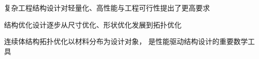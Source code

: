 \documentclass[notheorems]{beamer}
\begin{document}
\begin{frame}
\begin{columns}[T, totalwidth=\linewidth]
		\end{columns}
		
		\vspace{1em}
		
		{\fontsize{8.5}{14}\selectfont\sffamily
			\noindent
			\parbox[t]{\dimexpr\linewidth - 1.5em\relax}{%
				复杂工程结构设计对轻量化、高性能与工程可行性提出了更高要求}
			
			\vspace{5pt}\noindent
			\parbox[t]{\dimexpr\linewidth - 1.5em\relax}{%
				结构优化设计逐步从尺寸优化、形状优化发展到拓扑优化}
			
			\vspace{5pt}\noindent
			\parbox[t]{\dimexpr\linewidth - 1.5em\relax}{%
				连续体结构拓扑优化以材料分布为设计对象，
				是性能驱动结构设计的重要数学工具}
		}
		
	\end{frame}
	
	
\end{document}
